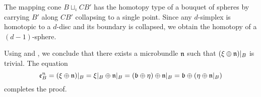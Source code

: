\begin{myproof}
\begin{enumerate}
        The mapping cone $B \sqcup_\iota CB'$ has the homotopy type of a bouquet of spheres
        by carrying $B'$ along $CB'$ collapsing to a single point.
        Since any $d$-simplex is homotopic to a $d$-disc and its boundary is collapsed,
        we obtain the homotopy of a $(d - 1)$-sphere.
        
        Using  and ,
        we conclude that there exists a microbundle $\mathfrak{n}$ such that $(\xi \oplus{} \mathfrak{n})\vert_{B}$ is trivial.
        The equation
        \[
            \be{B}
            = (\whitney{\xi}{\bn})\restr{B}
            = \whitney{\xi\restr{B}}{\bn\restr{B}}
            = \whitney{(\whitney{\bb}{\eta})}{\bn\restr{B}}
            = \whitney{\bb}{(\whitney{\eta}{\bn\restr{B}})}
        \]
        completes the proof.
    \end{enumerate}
\end{myproof}